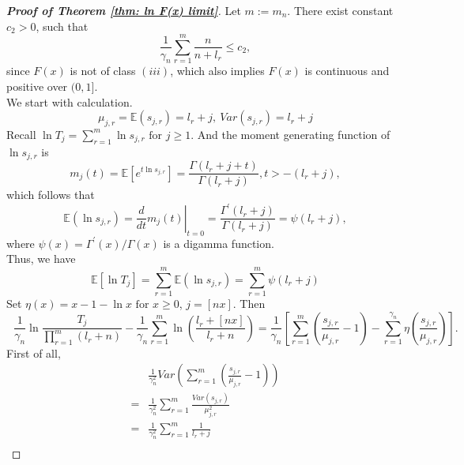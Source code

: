 \documentclass[12pt]{article}
\theoremstyle{plain}
\theoremstyle{definition}
\theoremstyle{remark}
\begin{document}
\begin{proof}[\textit{\textbf{Proof of Theorem \ref{thm: ln F(x) limit}}}]
    Let $m:=m_n$. There exist constant $c_2>0$, such that $$\frac{1}{\gamma_{n}} \sum_{r=1}^{m} \frac{n}{n+l_{r}}\leq c_2,$$ since $F(x)$ is not of class $(iii)$, which also implies $F(x)$ is continuous and positive over $(0,1]$.\\
    We start with calculation.
    \begin{equation*}
        \mu_{j, r}=\mathbb{E}\left(s_{j, r}\right)=l_{r}+j,\ {Var}\left(s_{j, r}\right)=l_{r}+j
    \end{equation*}
    Recall $\ln T_{j}=\sum_{r=1}^{m} \ln s_{j, r} \text { for } j \geq 1$. And the moment generating function of $\ln s_{j, r}$ is
    \begin{equation*}
        m_{j}(t)=\mathbb{E}\left[e^{t \ln s_{j, r}}\right]=\frac{\Gamma\left(l_{r}+j+t\right)}{\Gamma\left(l_{r}+j\right)}, t>-(l_r+j),
    \end{equation*}
    which follows that
    \begin{equation*}
        \mathbb{E}\left(\ln s_{j, r}\right)=\left.\frac{d}{d t} m_{j}(t)\right|_{t=0}=\frac{\Gamma^{\prime}\left(l_{r}+j\right)}{\Gamma\left(l_{r}+j\right)}=\psi\left(l_{r}+j\right),
    \end{equation*}
    where $\psi(x)=\Gamma^{\prime}(x) / \Gamma(x)$ is a digamma function.\\
    Thus, we have
    \begin{equation*}
        \mathbb{E}\left[\ln T_{j}\right]=\sum_{r=1}^{m} \mathbb{E}\left(\ln s_{j, r}\right)=\sum_{r=1}^{m} \psi\left(l_{r}+j\right)
    \end{equation*}
    Set $\eta(x)=x-1-\ln x \text { for } x \geq 0$, $j=[nx]$. Then
    \begin{equation}\label{formular_lnT_mid}
    \ \ \ \dfrac{1}{\gamma_{n}}\ln \frac{T_{j}}{\prod_{r=1}^{m}(l_r+n)}-\dfrac{1}{\gamma_{n}} \sum_{r=1}^{m}\ln (\frac{l_r+[nx]}{l_r+n})=\dfrac{1}{\gamma_{n}}[\sum_{r=1}^{m}(\frac{s_{j,r}}{\mu_{j,r}}-1)-\sum_{r=1}^{\gamma_{n}}\eta(\frac{s_{j,r}}{\mu_{j,r}})].
    \end{equation}
    First of all,
    \begin{equation*}
        \begin{aligned}
            &\frac{1}{\gamma_{n}^2} {Var}\left(\sum_{r=1}^{m}\left(\frac{s_{j, r}}{\mu_{j, r}}-1\right)\right)\\
            =&\frac{1}{\gamma_{n}^2}\sum_{r=1}^{m} \frac{{Var}\left(s_{j, r}\right)}{\mu_{j, r}^{2}} \\ =&\frac{1}{\gamma_{n}^2}\sum_{r=1}^{m} \frac{1}{l_{r}+j} \\

\end{aligned}
\end{equation*}
\end{proof}
\end{document}
